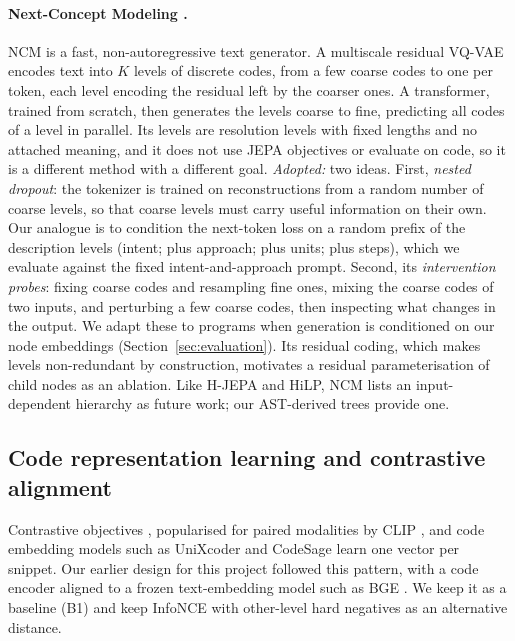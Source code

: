 \documentclass[11pt]{article}
\begin{document}
\paragraph{Next-Concept Modeling \citep{kumbong2026ncm}.}
NCM is a fast, non-autoregressive text generator. A multiscale residual VQ-VAE encodes text into $K$ levels of
discrete codes, from a few coarse codes to one per token, each level encoding the residual left by the coarser ones.
A transformer, trained from scratch, then generates the levels coarse to fine, predicting all codes of a level in
parallel. Its levels are resolution levels with fixed lengths and no attached meaning, and it does not use JEPA
objectives or evaluate on code, so it is a different method with a different goal.
\emph{Adopted:} two ideas. First, \emph{nested dropout}: the tokenizer is trained on reconstructions from a random
number of coarse levels, so that coarse levels must carry useful information on their own. Our analogue is to
condition the next-token loss on a random prefix of the description levels (intent; plus approach; plus units; plus
steps), which we evaluate against the fixed intent-and-approach prompt. Second, its \emph{intervention probes}: fixing
coarse codes and resampling fine ones, mixing the coarse codes of two inputs, and perturbing a few coarse codes,
then inspecting what changes in the output. We adapt these to programs when generation is conditioned on our node
embeddings (Section~\ref{sec:evaluation}). Its residual coding, which makes levels non-redundant by construction,
motivates a residual parameterisation of child nodes as an ablation. Like H-JEPA and HiLP, NCM lists an
input-dependent hierarchy as future work; our AST-derived trees provide one.

\subsection{Code representation learning and contrastive alignment}

Contrastive objectives \citep{oord2018cpc}, popularised for paired modalities by CLIP \citep{radford2021clip}, and
code embedding models such as UniXcoder \citep{guo2022unixcoder} and CodeSage \citep{zhang2024codesage} learn one
vector per snippet. Our earlier design for this project followed this pattern, with a code encoder aligned to a frozen
text-embedding model such as BGE \citep{xiao2023cpack}. We keep it as a baseline (B1) and keep InfoNCE with
other-level hard negatives as an alternative distance.
\end{document}
